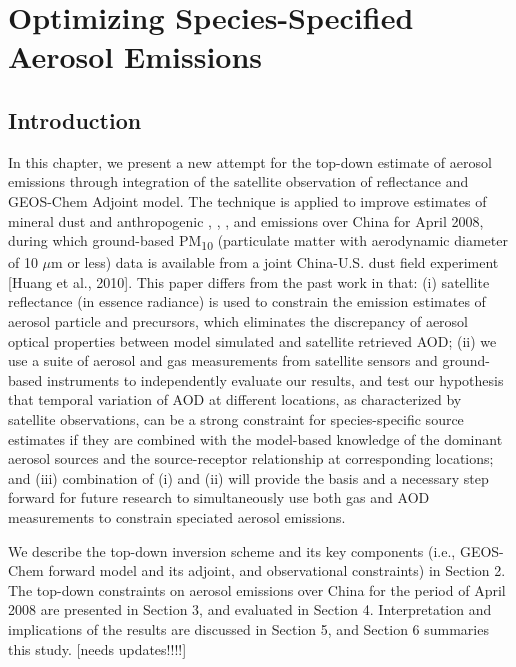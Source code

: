 \chapter{Optimizing Species-Specified Aerosol Emissions} \label{chap:optems}

\section{Introduction}

 In this chapter, we present a new attempt for the top-down estimate 
 of aerosol emissions through integration of the satellite observation 
 of reflectance and GEOS-Chem Adjoint model. 
 The technique is applied to improve estimates of mineral dust 
 and anthropogenic , , ,  and  
 emissions over China for April 2008, during which ground-based 
 PM\textsubscript{10} (particulate matter with aerodynamic diameter of 
 10 $\mu$m or less) data is available from a joint China-U.S. 
 dust field experiment [Huang et al., 2010]. 
 This paper differs from the past work in that: 
 (i) satellite reflectance (in essence radiance) is used 
 to constrain the emission estimates of aerosol particle and precursors, 
 which eliminates the discrepancy of aerosol optical properties 
 between model simulated and satellite retrieved AOD; 
 (ii) we use a suite of aerosol and gas measurements 
 from satellite sensors and ground-based instruments 
 to independently evaluate our results, and test our hypothesis 
 that temporal variation of AOD at different locations, 
 as characterized by satellite observations, can be a strong constraint 
 for species-specific source estimates if they are combined with 
 the model-based knowledge of the dominant aerosol sources 
 and the source-receptor relationship at corresponding locations; 
 and (iii) combination of (i) and (ii) will provide the basis and 
 a necessary step forward for future research to simultaneously 
 use both gas and AOD measurements to constrain speciated aerosol emissions. 

 We describe the top-down inversion scheme and its key components 
 (i.e., GEOS-Chem forward model and its adjoint, and observational constraints) 
 in Section 2. The top-down constraints on aerosol emissions over China 
 for the period of April 2008 are presented in Section 3, 
 and evaluated in Section 4. Interpretation and 
 implications of the results are discussed in Section 5, 
 and Section 6 summaries this study. [needs updates!!!!]


